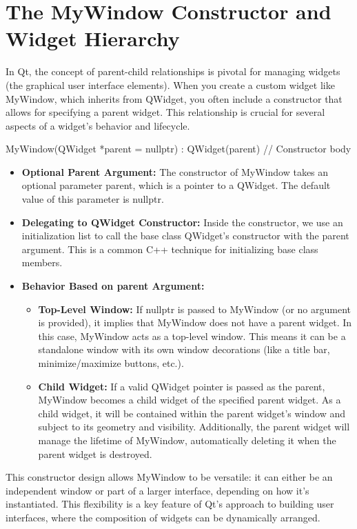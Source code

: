 \documentclass{report}
\begin{document}
    \section*{The MyWindow Constructor and Widget Hierarchy}
    \bigbreak \noindent
    In Qt, the concept of parent-child relationships is pivotal for managing widgets (the graphical user interface elements). When you create a custom widget like MyWindow, which inherits from QWidget, you often include a constructor that allows for specifying a parent widget. This relationship is crucial for several aspects of a widget's behavior and lifecycle.
    \bigbreak \noindent 
    \begin{cppcode}
MyWindow(QWidget *parent = nullptr) : QWidget(parent) {
    // Constructor body
}
    \end{cppcode}
    \bigbreak \noindent 
    \begin{itemize}
        \item \textbf{Optional Parent Argument:} The constructor of MyWindow takes an optional parameter parent, which is a pointer to a QWidget. The default value of this parameter is nullptr.
        \item \textbf{Delegating to QWidget Constructor:} Inside the constructor, we use an initialization list to call the base class QWidget's constructor with the parent argument. This is a common C++ technique for initializing base class members.
        \item \textbf{Behavior Based on parent Argument:}
        \begin{itemize}
            \item \textbf{Top-Level Window:} If nullptr is passed to MyWindow (or no argument is provided), it implies that MyWindow does not have a parent widget. In this case, MyWindow acts as a top-level window. This means it can be a standalone window with its own window decorations (like a title bar, minimize/maximize buttons, etc.).
            \item \textbf{Child Widget:} If a valid QWidget pointer is passed as the parent, MyWindow becomes a child widget of the specified parent widget. As a child widget, it will be contained within the parent widget's window and subject to its geometry and visibility. Additionally, the parent widget will manage the lifetime of MyWindow, automatically deleting it when the parent widget is destroyed.
        \end{itemize}
    \end{itemize}
    \bigbreak \noindent 
    This constructor design allows MyWindow to be versatile: it can either be an independent window or part of a larger interface, depending on how it's instantiated. This flexibility is a key feature of Qt's approach to building user interfaces, where the composition of widgets can be dynamically arranged.
\end{document}
